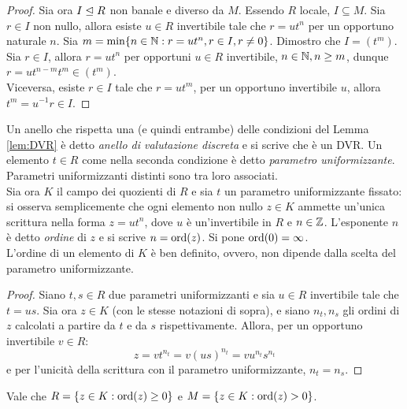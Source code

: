 \begin{proof}
            Sia ora $I \trianglelefteq R$ non banale e diverso da $M$. Essendo $R$ locale, $I \subseteq M$. Sia $r \in I$ non nullo, allora esiste $u \in R$ invertibile tale che $r = ut^n$ 
            per un opportuno naturale $n$. Sia $m = \min\{n \in \mathbb{N} : r = ut^n, r \in I, r \neq 0\}$. Dimostro che $I = (t^m)$.\\
            Sia $r \in I$, allora $r = ut^n$ per opportuni $u \in R$ invertibile, $n \in \mathbb{N}, n \geq m$, dunque $r = ut^{n-m}t^m \in (t^m)$.\\
            Viceversa, esiste $r \in I$ tale che $r = ut^m$, per un opportuno invertibile $u$, allora $t^m = u^{-1}r \in I$.
        \end{proof}
        Un anello che rispetta una (e quindi entrambe) delle condizioni del Lemma \ref{lem:DVR} è detto \emph{anello di valutazione discreta} e si scrive che è un DVR. 
        Un elemento $t \in R$ come nella seconda condizione è detto \emph{parametro uniformizzante}. Parametri uniformizzanti distinti sono tra loro associati. \\
        Sia ora $K$ il campo dei quozienti di $R$ e sia $t$ un parametro uniformizzante fissato: si osserva semplicemente che ogni elemento non nullo $z \in K$ ammette 
        un'unica scrittura nella forma $z = ut^n$, dove $u$ è un'invertibile in $R$ e $n \in \mathbb{Z}$. L'esponente $n$ è detto \emph{ordine} di $z$ e si scrive $n = \operatorname{ord}(z)$.
        Si pone $\operatorname{ord}(0) = \infty$. \\
        L'ordine di un elemento di $K$ è ben definito, ovvero, non dipende dalla scelta del parametro uniformizzante.
        \begin{proof}
            Siano $t,s \in R$ due parametri uniformizzanti e sia $u \in R$ invertibile tale che $t = us$. Sia ora $z \in K$ (con le stesse notazioni di sopra), e siano 
            $n_t,n_s$ gli ordini di $z$ calcolati a partire da $t$ e da $s$ rispettivamente. Allora, per un opportuno invertibile $v \in R$: \begin{equation*}
                z = vt^{n_t} = v(us)^{n_t} = vu^{n_t}s^{n_t}
            \end{equation*}
            e per l'unicità della scrittura con il parametro uniformizzante, $n_t = n_s$.
        \end{proof}
        \begin{osservazione}
            Vale che $R = \{z \in K : \operatorname{ord}(z) \geq 0\}$ e $M = \{z \in K : \operatorname{ord}(z) > 0\}$.
        \end{osservazione}

